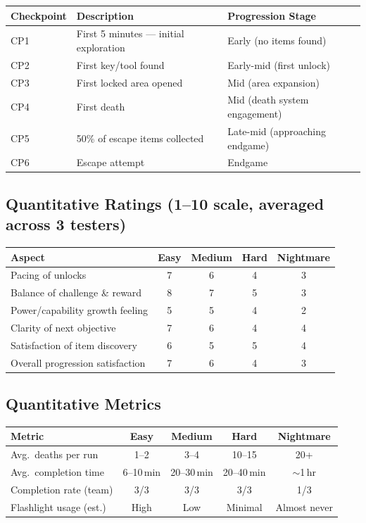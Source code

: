 \documentclass[11pt]{article}
\begin{document}
\begin{table}[h]
\centering
\small
\begin{tabular}{@{}lll@{}}
\toprule
\textbf{Checkpoint} & \textbf{Description} & \textbf{Progression Stage} \\
\midrule
CP1 & First 5 minutes --- initial exploration & Early (no items found) \\
CP2 & First key/tool found & Early-mid (first unlock) \\
CP3 & First locked area opened & Mid (area expansion) \\
CP4 & First death & Mid (death system engagement) \\
CP5 & 50\% of escape items collected & Late-mid (approaching endgame) \\
CP6 & Escape attempt & Endgame \\
\bottomrule
\end{tabular}
\end{table}

\subsection{Quantitative Ratings (1--10 scale, averaged across 3 testers)}

\begin{table}[h]
\centering
\small
\begin{tabular}{@{}lcccc@{}}
\toprule
\textbf{Aspect} & \textbf{Easy} & \textbf{Medium} & \textbf{Hard} & \textbf{Nightmare} \\
\midrule
Pacing of unlocks & 7 & 6 & 4 & 3 \\
Balance of challenge \& reward & 8 & 7 & 5 & 3 \\
Power/capability growth feeling & 5 & 5 & 4 & 2 \\
Clarity of next objective & 7 & 6 & 4 & 4 \\
Satisfaction of item discovery & 6 & 5 & 5 & 4 \\
Overall progression satisfaction & 7 & 6 & 4 & 3 \\
\bottomrule
\end{tabular}
\end{table}

\subsection{Quantitative Metrics}

\begin{table}[h]
\centering
\small
\begin{tabular}{@{}lcccc@{}}
\toprule
\textbf{Metric} & \textbf{Easy} & \textbf{Medium} & \textbf{Hard} & \textbf{Nightmare} \\
\midrule
Avg.\ deaths per run & 1--2 & 3--4 & 10--15 & 20+ \\
Avg.\ completion time & 6--10\,min & 20--30\,min & 20--40\,min & $\sim$1\,hr \\
Completion rate (team) & 3/3 & 3/3 & 3/3 & 1/3 \\
Flashlight usage (est.) & High & Low & Minimal & Almost never \\
\bottomrule
\end{tabular}
\end{table}
\end{document}
